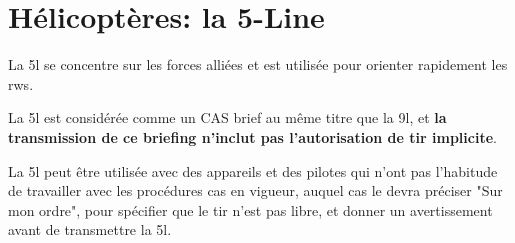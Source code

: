 \newpage
\section{Hélicoptères: la 5-Line}

La \gls{5l} se concentre sur les forces alliées et est utilisée pour orienter rapidement les \glspl{rw}.


La \gls{5l} est considérée comme un CAS brief au même titre que la \gls{9l}, et \textbf{la transmission de ce briefing n'inclut pas l'autorisation de tir implicite}.

La \gls{5l} peut être utilisée avec des appareils et des pilotes qui n'ont pas l'habitude de travailler avec les procédures \gls{cas} en vigueur, auquel cas le \ja{} devra préciser "Sur mon ordre", pour spécifier que le tir n'est pas libre, et donner un avertissement avant de transmettre la \gls{5l}.

